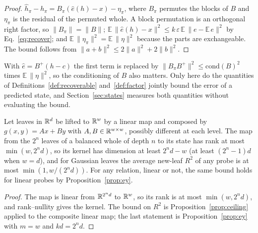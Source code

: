 \begin{proof}
$\hat{h}_\pi - h_\pi = B_\pi(\hat{e}(h) - x) - \eta_\pi$, where $B_\pi$ permutes the blocks of $B$ and $\eta_\pi$ is the residual of the permuted whole. A block permutation is an orthogonal right factor, so $\lVert B_\pi \rVert = \lVert B \rVert$; $\mathbb{E}\,\lVert \hat{e}(h) - x \rVert^2 \le k\,\varepsilon\,\mathbb{E}\,\lVert e - \mathbb{E}\,e\rVert^2$ by Eq.~\eqref{eq:recover}; and $\mathbb{E}\,\lVert \eta_\pi \rVert^2 = \mathbb{E}\,\lVert \eta \rVert^2$ because the parts are exchangeable. The bound follows from $\lVert a + b \rVert^2 \le 2\lVert a \rVert^2 + 2\lVert b \rVert^2$.
\end{proof}

\noindent
With $\hat{e} = B^{+}(h - c)$ the first term is replaced by $\lVert B_\pi B^{+} \rVert^2 \le \mathrm{cond}(B)^2$ times $\mathbb{E}\,\lVert \eta \rVert^2$, so the conditioning of $B$ also matters. Only here do the quantities of Definitions~\ref{def:recoverable} and~\ref{def:factor} jointly bound the error of a predicted state, and Section~\ref{sec:states} measures both quantities without evaluating the bound.

\begin{proposition}[Depth]
\label{prop:depth}
Let leaves in $\mathbb{R}^d$ be lifted to $\mathbb{R}^w$ by a linear map and composed by $g(x, y) = Ax + By$ with $A, B \in \mathbb{R}^{w \times w}$, possibly different at each level. The map from the $2^n$ leaves of a balanced whole of depth $n$ to its state has rank at most $\min(w, 2^n d)$, so its kernel has dimension at least $2^n d - w$ (at least $(2^n - 1)d$ when $w = d$), and for Gaussian leaves the average new-leaf $R^2$ of any probe is at most $\min(1, w/(2^n d))$. For any relation, linear or not, the same bound holds for linear probes by Proposition~\ref{prop:ey}.
\end{proposition}

\begin{proof}
The map is linear from $\mathbb{R}^{2^n d}$ to $\mathbb{R}^w$, so its rank is at most $\min(w, 2^n d)$, and rank--nullity gives the kernel. The bound on $R^2$ is Proposition~\ref{prop:ceiling} applied to the composite linear map; the last statement is Proposition~\ref{prop:ey} with $m = w$ and $kd = 2^n d$.
\end{proof}

\noindent

